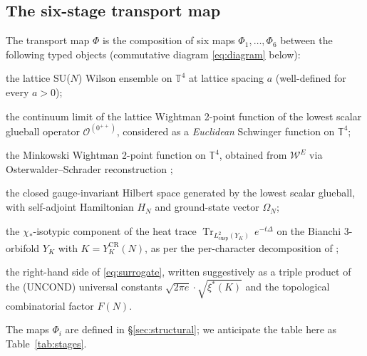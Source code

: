 \documentclass[11pt,a4paper,reqno]{amsart}
\theoremstyle{definition}
\DeclareMathOperator{\Tr}{Tr}
\newcommand{\YK}{Y_K}
\newcommand{\YKCR}{Y_K^{\mathrm{CR}}}
\newcommand{\TT}{\mathbb{T}}
\newcommand{\Phii}[1]{\Phi_{#1}}
\newcommand{\xis}{\xi^{*}}
\newcommand{\Lcusp}{L^2_{\mathrm{cusp}}}
\begin{document}
\subsection{The six-stage transport map}\label{ss:six-stage}

The transport map $\Phi$ is the composition of six maps
$\Phii{1},\ldots,\Phii{6}$ between the following typed objects
(commutative diagram \eqref{eq:diagram} below):

\begin{description}[leftmargin=2.4em,labelwidth=3em,style=multiline]
  \item[$\mathcal{L}(N,a)$] the lattice SU($N$) Wilson ensemble on
        $\TT^4$ at lattice spacing $a$ (well-defined for every
        $a>0$);
  \item[$\mathcal{W}^E_{a\to 0}(N)$] the continuum limit of the lattice
        Wightman 2-point function of the lowest scalar glueball
        operator $\mathcal{O}^{(0^{++})}$, considered as a
        \emph{Euclidean} Schwinger function on $\TT^4$;
  \item[$\mathcal{W}^M(N)$] the Minkowski Wightman 2-point function on
        $\TT^4$, obtained from $\mathcal{W}^E$ via
        Osterwalder--Schrader reconstruction \cite{OsterwalderSchrader1973,
        OsterwalderSchrader1975};
  \item[$\mathcal{H}_{0^{++}}(N)$] the closed gauge-invariant Hilbert
        space generated by the lowest scalar glueball, with
        self-adjoint Hamiltonian $H_N$ and ground-state vector
        $\Omega_N$;
  \item[$\mathcal{T}^{(\chi_*)}_K$] the $\chi_*$-isotypic component of
        the heat trace $\Tr_{\Lcusp(\YK)}\,e^{-t\Delta}$ on the Bianchi
        3-orbifold $\YK$ with $K = \YKCR(N)$, as per the
        per-character decomposition of
        \cite{Remondiere2026Selberg};
  \item[$\xis(K)\cdot\sqrt{\lambda_1(\Delta_{\chi_*})}\cdot F(N)$] the
        right-hand side of \eqref{eq:surrogate}, written
        suggestively as a triple product of the (UNCOND) universal
        constants $\sqrt{2\pi e}\cdot\sqrt{\xis(K)}$ and the
        topological combinatorial factor $F(N)$.
\end{description}

The maps $\Phii{i}$ are defined in \S\ref{sec:structural}; we
anticipate the table here as Table~\ref{tab:stages}.
\end{document}
